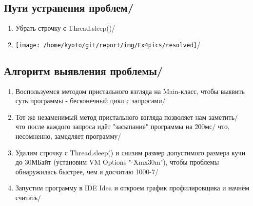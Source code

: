 \subsection{Пути устранения проблем/}
\begin{enumerate}
    \item Убрать строчку с Thread.sleep()/
    \item \texttt{[image: /home/kyoto/git/report/img/Ex4pics/resolved]}/
\end{enumerate}

\subsection{Алгоритм выявления проблемы/}
\begin{enumerate}
    \item Воспользуемся методом пристального взгляда на Main-класс, чтобы выявить суть программы - бесконечный цикл с запросами/
    \item Тот же незаменимый метод пристального взгляда позволяет нам заметить/ что после каждого запроса идёт "засыпание" программы на 200мс/ что, несомненно,
    замедляет программу/
    \item Удалим строчку с Thread.sleep() и снизим размер допустимого размера кучи до 30МБайт (установим VM Options "-Xmx30m"), чтобы проблемы обнаружилась
    быстрее, чем я досчитаю 1000-7/
    \item Запустим программу в IDE Idea и откроем график профилировщика и начнём считать/
    \newpage

    \thispagestyle{empty}


\end{enumerate}
